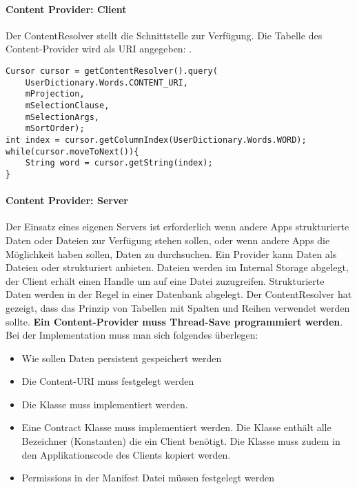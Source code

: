 \paragraph{Content Provider: Client} Der ContentResolver stellt die Schnittstelle zur Verfügung. Die Tabelle des Content-Provider wird als URI angegeben: .
\begin{lstlisting}
Cursor cursor = getContentResolver().query(
    UserDictionary.Words.CONTENT_URI,
    mProjection,
    mSelectionClause,
    mSelectionArgs,
    mSortOrder);
int index = cursor.getColumnIndex(UserDictionary.Words.WORD);
while(cursor.moveToNext()){
    String word = cursor.getString(index);
}
\end{lstlisting}
\paragraph{Content Provider: Server} Der Einsatz eines eigenen Servers ist erforderlich wenn andere Apps strukturierte Daten oder Dateien zur Verfügung stehen sollen, oder wenn andere Apps die Möglichkeit haben sollen, Daten zu durchsuchen. Ein Provider kann Daten als Dateien oder strukturiert anbieten. Dateien werden im Internal Storage abgelegt, der Client erhält einen Handle um auf eine Datei zuzugreifen. Strukturierte Daten werden in der Regel in einer Datenbank abgelegt. Der ContentResolver hat gezeigt, dass das Prinzip von Tabellen mit Spalten und Reihen verwendet werden sollte. \textbf{Ein Content-Provider muss Thread-Save programmiert werden}.\\
Bei der Implementation muss man sich folgendes überlegen:
\begin{itemize}
\item Wie sollen Daten persistent gespeichert werden
\item Die Content-URI muss festgelegt werden
\item Die Klasse  muss implementiert werden.
\item Eine Contract Klasse muss implementiert werden. Die Klasse enthält alle Bezeichner (Konstanten) die ein Client benötigt. Die Klasse muss zudem in den Applikationscode des Clients kopiert werden.
\item Permissions in der Manifest Datei müssen festgelegt werden
\end{itemize}